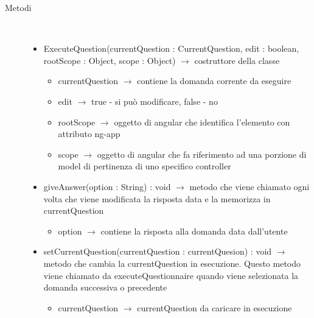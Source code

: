 \begin{description}
\item[Metodi] \hfill \\
\vspace{-7mm}
\begin{itemize}
	\item ExecuteQuestion(currentQuestion : CurrentQuestion, edit : boolean, rootScope : Object, scope : Object) $\rightarrow$ costruttore della classe\begin{itemize}
		\item currentQuestion $\rightarrow$ contiene la domanda corrente da eseguire 
		\item edit $\rightarrow$ true - si può modificare, false - no 
		\item rootScope $\rightarrow$ oggetto di angular che identifica l’elemento con attributo ng-app
		\item scope $\rightarrow$ oggetto di angular che fa riferimento ad una porzione di model di pertinenza di uno specifico controller
	\end{itemize}
	
	\item giveAnswer(option : String) : void $\rightarrow$ metodo che viene chiamato ogni volta che viene modificata la risposta data e la memorizza in currentQuestion\begin{itemize}
		\item option $\rightarrow$ contiene la risposta alla domanda  data dall'utente 
	\end{itemize}
	
	\item setCurrentQuestion(currentQuestion : currentQuesion) : void $\rightarrow$ metodo che cambia la currentQuestion in esecuzione. Questo metodo viene chiamato da executeQuestionnaire quando viene selezionata la domanda successiva o precedente\begin{itemize}
		\item currentQuestion $\rightarrow$ currentQuestion da caricare in esecuzione
	\end{itemize}
	
\end{itemize}

\end{description}

\vspace{0.5cm}

